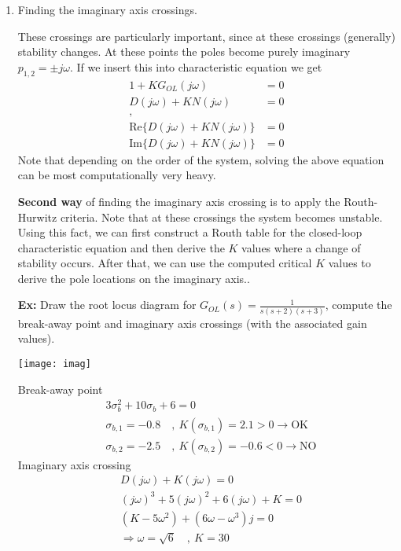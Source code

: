 \documentclass[twoside]{article}
\begin{document}
\begin{enumerate}
\item Finding the imaginary axis crossings. 

These crossings are particularly important, since at these crossings
(generally)   stability changes. At these points the poles become purely
imaginary $p_{1,2} = \pm j \omega$. If we insert this into characteristic 
equation we get
%
\begin{align*}
1 + K G_{OL} (j \omega) &= 0 \\
D(j \omega) + K N(j \omega) &= 0 \\ ,
\\
\mathrm{Re} \lbrace D(j \omega) + K N(j \omega) \rbrace &= 0 \\
\mathrm{Im} \lbrace D(j \omega) + K N(j \omega) \rbrace &= 0 
\end{align*}
%
Note that depending on the order of the system, 
solving the above equation can be 
most computationally very heavy.

\textbf{Second way} of finding the imaginary axis crossing is to
apply the Routh-Hurwitz criteria. Note that at these crossings the 
system becomes unstable. Using this fact, we can first construct a 
Routh table for the closed-loop characteristic equation and then 
derive the $K$ values where a change of stability occurs. After that, we can
use the computed critical $K$ values to derive the pole locations
on the imaginary axis..

\vspace{6pt}

\textbf{Ex:} Draw the root locus diagram for $G_{OL}(s) = \frac{1}{s (s+2) (s+3)}$,
compute the break-away point and imaginary axis crossings 
(with the associated gain values).

\vspace{12pt}

\begin{minipage}[h]{0.55\linewidth}
    \begin{center}
      \texttt{[image: imag]}
    \end{center}
\end{minipage}
\begin{minipage}[h]{0.45\linewidth}
	Break-away point
	\begin{align*}
	& 3 \sigma_{b}^2 + 10 \sigma_b + 6 = 0 
	\\
	& \sigma_{b,1} = - 0.8  \quad , \ K(\sigma_{b,1}) = 2.1 > 0 \rightarrow \mathrm{OK}
	\\
	& \sigma_{b,2} =  -2.5 \quad , \ K(\sigma_{b,2}) = -0.6 < 0 \rightarrow \mathrm{NO}
	\end{align*}
	Imaginary axis crossing
	\begin{align*}
	& D(j \omega) + K (j \omega) = 0 \\ 	 
	& (j \omega)^3 + 5 (j \omega)^2 + 6 (j \omega) + K = 0 \\ 
	& (K - 5 \omega^2) + (6 \omega - \omega^3) j  = 0
	\\ & \Rightarrow \omega = \sqrt{6}  \quad , \ K = 30
	\end{align*}
\end{minipage}


\end{enumerate}
\end{document}
